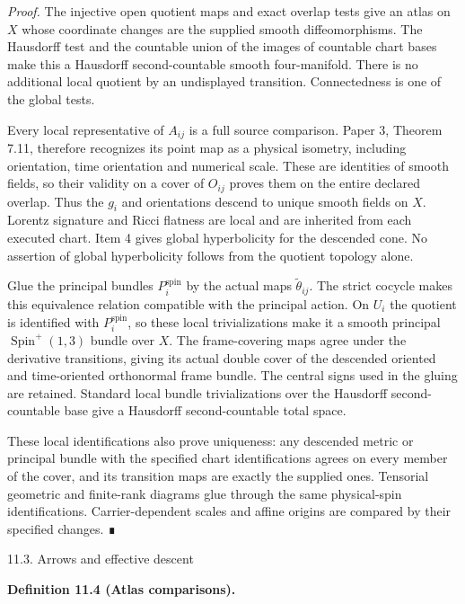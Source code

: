 \documentclass[
  english,
  11pt,
  reqno]{amsart}
\makeatletter
\newcommand{\paperstatementsection}{\@startsection{subsection}{2}%
  \z@{.5\linespacing\@plus.7\linespacing}{.35\baselineskip}%
  {\normalfont\bfseries}}
\newcommand{\paperfirststatement}[1]{%
  {\normalfont\bfseries #1\par}%
  \nobreak\@afterindenttrue\@afterheading}
\makeatother
\begin{document}
\emph{Proof.} The injective open quotient maps and exact overlap tests
give an atlas on \(X\) whose coordinate changes are the supplied smooth
diffeomorphisms. The Hausdorff test and the countable union of the
images of countable chart bases make this a Hausdorff second-countable
smooth four-manifold. There is no additional local quotient by an
undisplayed transition. Connectedness is one of the global tests.

Every local representative of \(A_{ij}\) is a full source comparison.
Paper 3, Theorem 7.11, therefore recognizes its point map as a physical
isometry, including orientation, time orientation and numerical scale.
These are identities of smooth fields, so their validity on a cover of
\(O_{ij}\) proves them on the entire declared overlap. Thus the \(g_i\)
and orientations descend to unique smooth fields on \(X\). Lorentz
signature and Ricci flatness are local and are inherited from each
executed chart. Item 4 gives global hyperbolicity for the descended
cone. No assertion of global hyperbolicity follows from the quotient
topology alone.

Glue the principal bundles \(P_i^{\mathrm{spin}}\) by the actual maps
\(\widetilde\theta_{ij}\). The strict cocycle makes this equivalence
relation compatible with the principal action. On \(U_i\) the quotient
is identified with \(P_i^{\mathrm{spin}}\), so these local
trivializations make it a smooth principal
\(\operatorname{Spin}^+(1,3)\) bundle over \(X\). The frame-covering
maps agree under the derivative transitions, giving its actual double
cover of the descended oriented and time-oriented orthonormal frame
bundle. The central signs used in the gluing are retained. Standard
local bundle trivializations over the Hausdorff second-countable base
give a Hausdorff second-countable total space.

These local identifications also prove uniqueness: any descended metric
or principal bundle with the specified chart identifications agrees on
every member of the cover, and its transition maps are exactly the
supplied ones. Tensorial geometric and finite-rank diagrams glue through
the same physical-spin identifications. Carrier-dependent scales and
affine origins are compared by their specified changes. ∎

\protect{}\label{sec:ordinary-atlas-arrows-descent}
\paperstatementsection{11.3. Arrows and effective
descent}\label{arrows-and-effective-descent}
\paperfirststatement{\protect{}\label{def:ordinary-atlas-embedding-category}Definition 11.4 (Atlas comparisons).}
\end{document}
